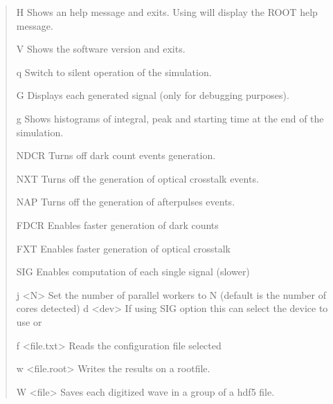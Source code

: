 \documentclass[letterpaper,10pt,english]{sphinxmanual}
\begin{document}
\begin{quote}
\begin{optionlist}{3cm}
\item [\sphinxhyphen{}H]  
Shows an help message and exits. Using  will display the ROOT help message.
\item [\sphinxhyphen{}V]  
Shows the software version and exits.
\item [\sphinxhyphen{}q]  
Switch to silent operation of the simulation.
\item [\sphinxhyphen{}G]  
Displays each generated signal (only for debugging purposes).
\item [\sphinxhyphen{}g]  
Shows histograms of integral, peak and starting time at the end of the simulation.
\item [\sphinxhyphen{}NDCR]  
Turns off dark count events generation.
\item [\sphinxhyphen{}NXT]  
Turns off the generation of optical crosstalk events.
\item [\sphinxhyphen{}NAP]  
Turns off the generation of afterpulses events.
\item [\sphinxhyphen{}FDCR]  
Enables faster generation of dark counts {\hyperref[\detokenize{theory:dcrtheory}]{}}
\item [\sphinxhyphen{}FXT]  
Enables faster generation of optical crosstalk {\hyperref[\detokenize{theory:xttheory}]{}}
\item [\sphinxhyphen{}SIG]  
Enables computation of each single signal (slower)
\item [\sphinxhyphen{}j \textless{}N\textgreater{}]  
Set the number of parallel workers to N (default is the number of cores detected)
\sphinxhyphen{}d \textless{}dev\textgreater{} If using \sphinxhyphen{}SIG option this can select the device to use  or 
\item [\sphinxhyphen{}f \textless{}file.txt\textgreater{}]  
Reads the configuration file selected
\item [\sphinxhyphen{}w \textless{}file.root\textgreater{}]  
Writes the results on a rootfile.
\item [\sphinxhyphen{}W \textless{}file\textgreater{}]  
Saves each digitized wave in a group of a hdf5 file.
\end{optionlist}
\end{quote}
\end{document}
